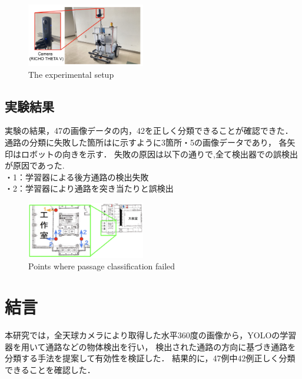 \documentclass[10pt]{jarticle}
\begin{document}
        \begin{figure}[!b]
            \includegraphics[width=0.46\textwidth]{./fig/experimental_machine_wide.png}
            \caption{The experimental setup}
            \label{fig:experiment_machine}
            \end{figure}
    
     \subsection{実験結果}%
     実験の結果，47の画像データの内，42を正しく分類できることが確認できた．
     通路の分類に失敗した箇所はに示すように3箇所・5の画像データであり，
     各矢印はロボットの向きを示す．
     失敗の原因は以下の通りで,全て検出器での誤検出が原因であった.\\
     ・1：学習器による後方通路の検出失敗\\
     ・2：学習器により通路を突き当たりと誤検出
     \begin{figure}[!b]
         \includegraphics[width=0.46\textwidth]{./fig/experiment_result.png}
         \caption{Points where passage classification failed}
         \label{fig:miss_classification}
     \end{figure}
    
    \section{結\hspace{2zw}言}%
    本研究では，全天球カメラにより取得した水平360度の画像から，YOLOの学習器を用いて通路などの物体検出を行い，
    検出された通路の方向に基づき通路を分類する手法を提案して有効性を検証した．
    結果的に，47例中42例正しく分類できることを確認した．
\end{document}
